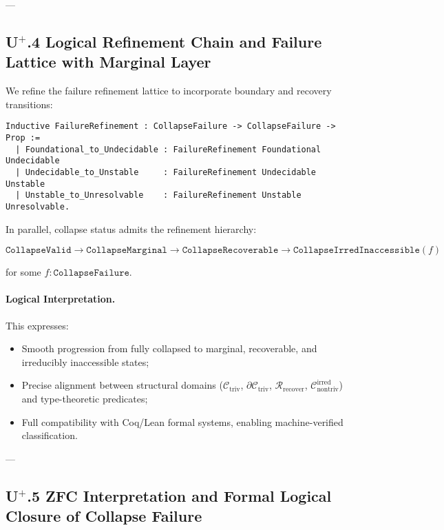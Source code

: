 \documentclass[11pt]{article}
\begin{document}
---

\subsection*{U$^{+}$.4 Logical Refinement Chain and Failure Lattice with Marginal Layer}

We refine the failure refinement lattice to incorporate boundary and recovery transitions:

\begin{lstlisting}[language=Coq]
Inductive FailureRefinement : CollapseFailure -> CollapseFailure -> Prop :=
  | Foundational_to_Undecidable : FailureRefinement Foundational Undecidable
  | Undecidable_to_Unstable     : FailureRefinement Undecidable Unstable
  | Unstable_to_Unresolvable    : FailureRefinement Unstable Unresolvable.
\end{lstlisting}

In parallel, collapse status admits the refinement hierarchy:

\[
\texttt{CollapseValid} \to \texttt{CollapseMarginal} \to \texttt{CollapseRecoverable} \to \texttt{CollapseIrredInaccessible}(f)
\]

for some $f : \texttt{CollapseFailure}$.

\paragraph{Logical Interpretation.}

This expresses:

\begin{itemize}
    \item Smooth progression from fully collapsed to marginal, recoverable, and irreducibly inaccessible states;
    \item Precise alignment between structural domains ($\mathcal{C}_{\mathrm{triv}}$, $\partial \mathcal{C}_{\mathrm{triv}}$, $\mathcal{R}_{\mathrm{recover}}$, $\mathcal{C}_{\mathrm{nontriv}}^{\mathrm{irred}}$) and type-theoretic predicates;
    \item Full compatibility with Coq/Lean formal systems, enabling machine-verified classification.
\end{itemize}

---

\subsection*{U$^{+}$.5 ZFC Interpretation and Formal Logical Closure of Collapse Failure}
\end{document}
